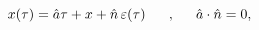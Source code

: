 \begin{equation}
x(\tau)=\hat{a}\tau + x +\hat{n}\, \varepsilon(\tau)\makebox[.5in]{,} \hat{a} \cdot \hat{n}=0,
\label{param}
\end{equation}

